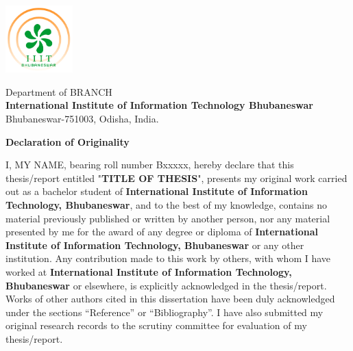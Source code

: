 \thispagestyle{empty} 
\begin{minipage}{.1\linewidth}
\hspace*{-.6cm}\includegraphics[height=2.6cm]{front/IIIT_Bhubaneswar_Logo}
\end{minipage}
\hspace{.4cm}
\begin{minipage}{1\linewidth}
{\normalsize
\textsf{Department of BRANCH\\
\textbf{International Institute of Information Technology Bhubaneswar\\}}}
{\normalsize
\textsf{
Bhubaneswar-751003, Odisha, India.}}
\end{minipage}
\vspace{.3in}

\fontsize{12}{14}
\selectfont
\begin{flushright}
\end{flushright}
\vspace{.1in}
\centerline{\Large{\bf Declaration of Originality}}
\vspace{0.5in}


I, MY NAME, bearing roll number Bxxxxx, hereby declare that this thesis/report entitled "{\bf TITLE OF THESIS}", presents my original work carried out as a bachelor student of {\bf International Institute of Information Technology, Bhubaneswar}, and to the best of my knowledge, contains no material previously published or written by another person, nor any material presented by me for the award of any degree or diploma of {\bf International Institute of Information Technology, Bhubaneswar} or any other institution. Any contribution made to this work by others, with whom I have worked at {\bf International Institute of Information Technology, Bhubaneswar} or elsewhere, is explicitly acknowledged in the thesis/report. Works of other authors cited in this dissertation have been duly acknowledged under the sections “Reference” or “Bibliography”. I have also submitted my original research records to the scrutiny committee for evaluation of my thesis/report.

\vspace*{0.2in}


